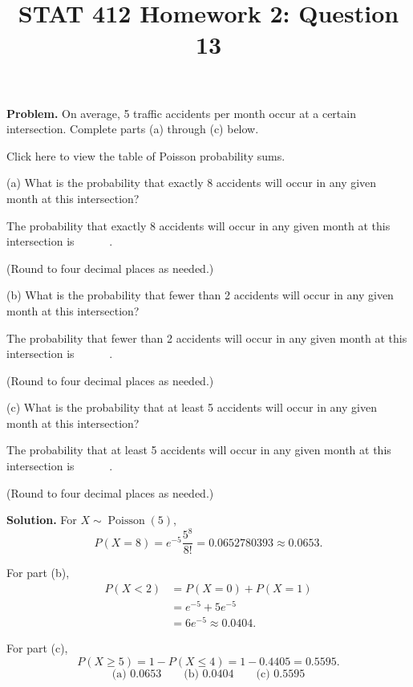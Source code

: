 \documentclass[11pt]{article}
\title{STAT 412 Homework 2: Question 13}
\author{}
\date{}
\begin{document}
\maketitle
\textbf{Problem.} On average, 5 traffic accidents per month occur at a certain
intersection. Complete parts (a) through (c) below.

Click here to view the table of Poisson probability sums.

(a) What is the probability that exactly 8 accidents will occur in any given
month at this intersection?

The probability that exactly 8 accidents will occur in any given month at this
intersection is \(\boxed{\phantom{0.0000}}\).

(Round to four decimal places as needed.)

(b) What is the probability that fewer than 2 accidents will occur in any given
month at this intersection?

The probability that fewer than 2 accidents will occur in any given month at
this intersection is \(\boxed{\phantom{0.0000}}\).

(Round to four decimal places as needed.)

(c) What is the probability that at least 5 accidents will occur in any given
month at this intersection?

The probability that at least 5 accidents will occur in any given month at this
intersection is \(\boxed{\phantom{0.0000}}\).

(Round to four decimal places as needed.)

\textbf{Solution.} For \(X\sim\operatorname{Poisson}(5)\),
\[
P(X=8)=e^{-5}\frac{5^8}{8!}=0.0652780393\approx0.0653.
\]

For part (b),
\[
\begin{aligned}
P(X<2)
&=P(X=0)+P(X=1)\\
&=e^{-5}+5e^{-5}\\
&=6e^{-5}\approx0.0404.
\end{aligned}
\]

For part (c),
\[
P(X\ge5)=1-P(X\le4)=1-0.4405=0.5595.
\]
\[
\boxed{\text{(a) }0.0653\qquad\text{(b) }0.0404\qquad
\text{(c) }0.5595}
\]
\end{document}
